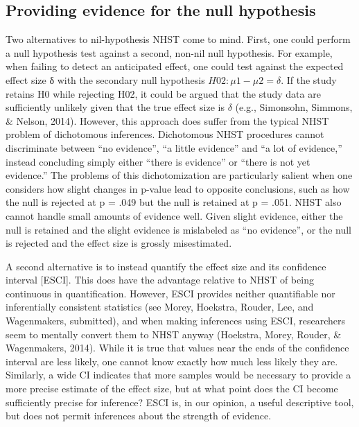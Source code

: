 \documentclass{article}
\begin{document}
\subsection{Providing evidence for the null hypothesis}
Two alternatives to nil-hypothesis NHST come to mind. First, one could perform a null hypothesis test against a second, non-nil null hypothesis. For example, when failing to detect an anticipated effect, one could test against the expected effect size δ with the secondary null hypothesis $H02: \mu 1 - \mu 2 = \delta$. If the study retains H0 while rejecting H02, it could be argued that the study data are sufficiently unlikely given that the true effect size is $\delta$ (e.g., Simonsohn, Simmons, \& Nelson, 2014). However, this approach does suffer from the typical NHST problem of dichotomous inferences. Dichotomous NHST procedures cannot discriminate between “no evidence”, “a little evidence” and “a lot of evidence,” instead concluding simply either “there is evidence” or “there is not yet evidence.” The problems of this dichotomization are particularly salient when one considers how slight changes in p-value lead to opposite conclusions, such as how the null is rejected at p = .049 but the null is retained at p = .051. NHST also cannot handle small amounts of evidence well. Given slight evidence, either the null is retained and the slight evidence is mislabeled as “no evidence”, or the null is rejected and the effect size is grossly misestimated. 

A second alternative is to instead quantify the effect size and its confidence interval [ESCI]. This does have the advantage relative to NHST of being continuous in quantification.  However, ESCI provides neither quantifiable nor inferentially consistent statistics (see Morey, Hoekstra, Rouder, Lee, and Wagenmakers, submitted), and when making inferences using ESCI, researchers seem to mentally convert them to NHST anyway (Hoekstra, Morey, Rouder, \& Wagenmakers, 2014). While it is true that values near the ends of the confidence interval are less likely, one cannot know exactly how much less likely they are. Similarly, a wide CI indicates that more samples would be necessary to provide a more precise estimate of the effect size, but at what point does the CI become sufficiently precise for inference? ESCI is, in our opinion, a useful descriptive tool, but does not permit inferences about the strength of evidence.
\end{document}
